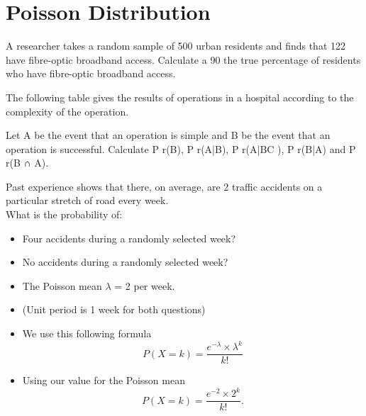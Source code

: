 \documentclass[]{article}
\begin{document}
\section{Poisson Distribution}


A researcher takes a random sample of 500 urban residents and finds that
122 have fibre-optic broadband access. Calculate a 90%
the true percentage of residents who have fibre-optic broadband access.

The following table gives the results of operations in a hospital according to the complexity of the
operation.



Let A be the event that an operation is simple and B be the event that an
operation is successful. Calculate P r(B), P r(A|B), P r(A|BC ), P r(B|A) and
P r(B ∩ A). 





Past experience shows that there, on average, are 2 traffic accidents on a particular stretch of road every week. 
\\
\bigskip
What is the probability of: 
\begin{itemize}
	
	\item Four accidents during a randomly selected week?  
	
	\item No accidents during a randomly selected week?  
\end{itemize}
\begin{itemize}
	
	\item The Poisson mean $\lambda$ = 2  per week.
	\item (Unit period is 1 week for both questions)
	\item We use this following formula
	\[ P(X=k) =  \frac{e^{-\lambda} \times \lambda ^k}{k!}  \]
	\item Using our value for the Poisson mean
	\[ P(X=k) =  \frac{e^{-2} \times 2^k}{k!} . \]
	
\end{itemize}
\end{document}
